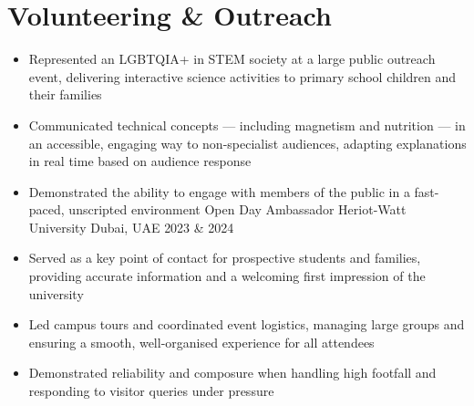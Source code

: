 \section{Volunteering \& Outreach}
\begin{itemize}[leftmargin=*]
  \compactSubheading
    {Science Alive Volunteer}
    {University of Sheffield}
    {Sheffield, UK}
    {Feb. 2025}
  \itemizeBegin  
    \item Represented an LGBTQIA+ in STEM society at a large public outreach event, delivering interactive science activities to primary school children and their families
    \item Communicated technical concepts — including magnetism and nutrition — in an accessible, engaging way to non-specialist audiences, adapting explanations in real time based on audience response
    \item Demonstrated the ability to engage with members of the public in a fast-paced, unscripted environment
  \itemizeEnd \vspace{-1em}
  \compactSubheading
    {Open Day Ambassador}
    {Heriot-Watt University}
    {Dubai, UAE}
    {2023 \& 2024}
  \itemizeBegin
    \item Served as a key point of contact for prospective students and families, providing accurate information and a welcoming first impression of the university
    \item Led campus tours and coordinated event logistics, managing large groups and ensuring a smooth, well-organised experience for all attendees
    \item Demonstrated reliability and composure when handling high footfall and responding to visitor queries under pressure
  \itemizeEnd 
\end{itemize}